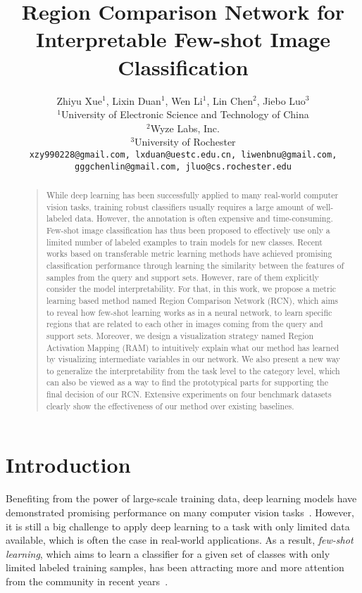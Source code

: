 \documentclass[letterpaper]{article}
\begin{document}
\title{Region Comparison Network for Interpretable Few-shot Image Classification}
\author{Zhiyu Xue$^1$, Lixin Duan$^1$, Wen Li$^1$, Lin Chen$^2$, Jiebo Luo$^3$\\
$^1$University of Electronic Science and Technology of China\\
$^2$Wyze Labs, Inc. \\
$^3$University of Rochester\\
{\tt\small xzy990228@gmail.com, lxduan@uestc.edu.cn,
liwenbnu@gmail.com,}\\
{\tt\small gggchenlin@gmail.com, jluo@cs.rochester.edu}
}
\maketitle
\begin{abstract}
\begin{quote}
While deep learning has been successfully applied to many real-world computer vision tasks, training robust classifiers usually requires a large amount of well-labeled data. However, the annotation is often expensive and time-consuming. Few-shot image classification has thus been proposed to effectively use only a limited number of labeled examples to train models for new classes. Recent works based on transferable metric learning methods have achieved promising classification performance through learning the similarity between the features of samples from the query and support sets. However, rare of them explicitly consider the model interpretability. For that, in this work, we propose a metric learning based method named Region Comparison Network (RCN), which aims to reveal how few-shot learning works as in a neural network, to learn specific regions that are related to each other in images coming from the query and support sets. Moreover, we design a visualization strategy named Region Activation Mapping (RAM) to intuitively explain what our method has learned by visualizing intermediate variables in our network. We also present a new way to generalize the interpretability from the task level to the category level, which can also be viewed as a way to find the prototypical parts for supporting the final decision of our RCN. Extensive experiments on four benchmark datasets clearly show the effectiveness of our method over existing baselines.
\end{quote}
\end{abstract}

\section{Introduction}
Benefiting from the power of large-scale training data, deep learning models have demonstrated promising performance on many computer vision tasks~\cite{huang2017densely,He2016Deep,szegedy2017inception,Krizhevsky2012Alex,HuSqueeze}. However, it is still a big challenge to apply deep learning to a task with only limited data available, which is often the case in real-world applications. 
As a result, \emph{few-shot learning}, which aims to learn a classifier for a given set of classes with only limited labeled training samples, has been attracting more and more attention from the community in recent years~\cite{huang2019compare,LiMeta,kim2019egnn}.
\end{document}
